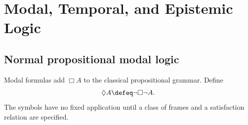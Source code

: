 \chapter{Modal, Temporal, and Epistemic Logic}
\label{ch:modal-temporal-epistemic}

\section{Normal propositional modal logic}
\label{sec:modal-temporal-epistemic-01}

Modal formulas add \(\Box A\) to the classical propositional grammar.  Define
\[
  \Diamond A\defeq\neg\Box\neg A.
\]
The symbols have no fixed application until a class of frames and a
satisfaction relation are specified.

